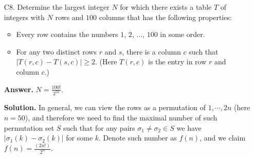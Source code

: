 \documentclass[11pt,a4paper]{article}
\begin{document}
\begin{enumerate}
\begin{proof}
        	Conversely, if we have such a collection of $A\to v_1\Rightarrow v_2\to B$, then these collections have edges disjoint from $A\to v\to B$, so such addition is valid. It therefore means we can pick the collection with maximum number of paths. 
        \end{proof}
        To finish, denote $C_{AB}$ as the quantity described in Lemma \ref{lemma_c4b}. 
        Such paths do not depend on $A$ and $B$ other than that we have in- and out-types of edges, so $C_{AB}=C_{BA}$. 
        Therefore, 
        \[
        N_{AB} = C_{AB} + 1\{A\to B\} + |\{v: \vec{AB}-\text{type}\}|
        \qquad 
        N_{BA} = C_{BA} + 1\{B\to A\} + |\{v: \vec{BA}-\text{type}\}|
        \]
        where $1\{A\to B\}$ means there's a directed edge $A\to B$. 
	    so $N_{AB}-N_{BA} = 1\{A\to B\} + |\{v: \vec{AB}-\text{type}\}| - (1\{B\to A\} + |\{v: \vec{BA}-\text{type}\}|)$. 
	    Given also that the out degree of $A$, $\text{out}(A)$ is given by 
	    $1\{A\to B\} + |\{v: \vec{AB}-\text{type}\}| + |\{v: \text{out-type}\}|$, 
	    we have 
	    \[
	    N_{AB} - N_{BA} = \text{out}(A) - \text{out}(B)
	    \]
	    as desired. 
	    
	    \item [C8.] 
	    Determine the largest integer $N$ for which there exists a table $T$ of integers with $N$ rows and $100$ columns that has the following properties:
	    \begin{itemize}
	    	\item Every row contains the numbers $1$, $2$, $\ldots$, $100$ in some order.
	    	
	    	\item For any two distinct rows $r$ and $s$, there is a column $c$ such that $|T(r,c) - T(s, c)|\geq 2$. (Here $T(r,c)$ is the entry in row $r$ and column $c$.)
	    \end{itemize}
        
        \textbf{Answer.} $N = \frac{100!}{2^{50}}$. 
        
        \textbf{Solution.} 
        In general, we can view the rows as a permutation of $1, \cdots, 2n$ (here $n=50$), 
        and therefore we need to find the maximal number of such permutation set $S$ such that for any pairs $\sigma_1\neq \sigma_2\in S$ we have $|\sigma_1(k)-\sigma_2(k)|$ for some $k$. 
        Denote such number as $f(n)$, and we claim $f(n)=\frac{(2n!)}{2^n}$. 
        

\end{enumerate}
\end{document}
